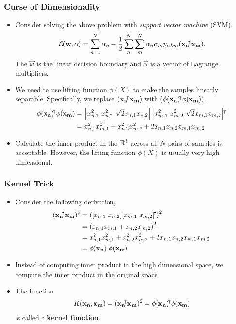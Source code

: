 \documentclass[10pt]{../formats/RU}
\begin{document}
\begin{frame}
\frametitle{Curse of Dimensionality}
\begin{itemize}
  \item<1-> Consider solving the above problem with \emph{support vector machine} (SVM).
  \begin{align*}
    \mathcal{L}(\mathbf{w}, \mathbf{\alpha}) = \sum_{n=1}^N\alpha_n - \frac{1}{2}\sum_{n}^{N}\sum_{m}^{N}\alpha_n\alpha_m y_ny_m(\mathbf{x_n}{}^{\mkern-4mu\intercal} \mathbf{x_m}).
  \end{align*}
  The $\vec{w}$ is the linear decision boundary and $\vec{\alpha}$ is a vector of Lagrange multipliers.
  \item <2-> We need to use lifting function $\phi(X)$ to make the samples linearly separable. Specifically, we replace $(\mathbf{x_n}{}^{\mkern-4mu\intercal} \mathbf{x_m})$ with $(\phi%
  (\mathbf{x_n})\trn
  \phi(\mathbf{x_m}))$.
  \begin{align*}
    \phi(\mathbf{x_n})\trn\phi(\mathbf{x_m})
    &= \bracks*{x_{n,1}^2 \ x_{n,2}^2 \ \sqrt{2}x_{n,1}x_{n,2}}\bracks*{x_{m,1}^2 \ x_{m,2}^2 \ \sqrt{2}x_{m,1}x_{m,2}}\trn \\
    &= x_{n,1}^2x_{m,1}^2 + x_{n,2}^2x_{m,2}^2 + 2x_{n,1}x_{n,2}x_{m,1}x_{m,2}
  \end{align*}
  \item<3-> Calculate the inner product in the $\mathbb{R}^3$ across all $N$ pairs of samples is acceptable. However, the lifting function $\phi(X)$ is usually very high dimensional.
\end{itemize}
\end{frame}
\begin{frame}
  \frametitle{Kernel Trick}
  \begin{itemize}
    \item <1-> Consider the following derivation,
    \begin{align*}
      (\mathbf{x_n}\trn \mathbf{x_m})^2
      &= \parens*{\bracks*{x_{n,1} \ x_{n,2}}\bracks*{x_{m,1} \ x_{m,2}}\trn}^2 \\
      &= \parens*{x_{n,1}x_{m,1} + x_{n,2}x_{m,2}}^2 \\
      &= x_{n,1}^2x_{m,1}^2 + x_{n,2}^2x_{m,2}^2 + 2x_{n,1}x_{n,2}x_{m,1}x_{m,2} \\
      &= \phi(\mathbf{x_n})\trn\phi(\mathbf{x_m})
    \end{align*}
    \item <2-> Instead of computing inner product in the high dimensional space, we compute the inner product in the original space.
    \item <3-> The function
    \begin{align*}
      K(\mathbf{x_n}, \mathbf{x_m}) = (\mathbf{x_n}{}^{\mkern-4mu\intercal} \mathbf{x_m})^2 = \phi(\mathbf{x_n}){}^{\mkern-4mu\intercal}\phi(\mathbf{x_m})
    \end{align*}
     is called a \textbf{kernel function}.
  \end{itemize}
\end{frame}
\end{document}
